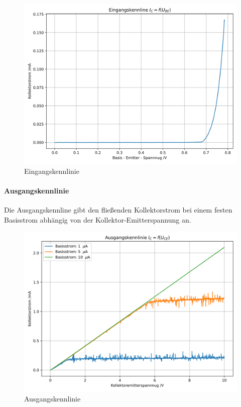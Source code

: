 \documentclass[12pt,twoside,a4paper]{scrartcl}
\begin{document}
	        \begin{figure}[H]
	            \centering
	            \includegraphics[width = 0.9 \textwidth]{Plots/Transistor/Einganskennline}
	            \caption{Eingangskennlinie}
	        \end{figure}



		    \paragraph{Ausgangskennlinie}

					Die Ausgangskennline gibt den fließenden Kollektorstrom bei einem festen Basisstrom abhängig von der Kollektor-Emitterspannung an.

            \begin{figure}[H]
                \centering

                \includegraphics[width = 0.9 \textwidth]{Plots/Transistor/Ausgangskennlinen}

                \caption{Ausgangskennlinie}
            \end{figure}
\end{document}
